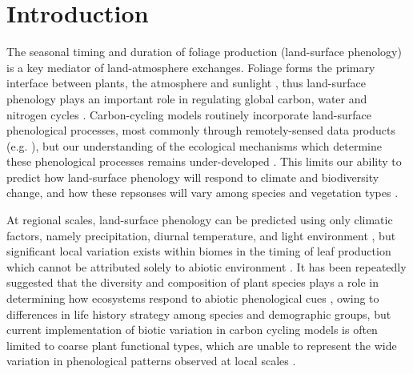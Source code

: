 \documentclass[11pt,a4paper]{article}
\begin{document}
\section{Introduction}

The seasonal timing and duration of foliage production (land-surface phenology) is a key mediator of land-atmosphere exchanges. Foliage forms the primary interface between plants, the atmosphere and sunlight \citep{Gu2003, Penuelas2009}, thus land-surface phenology plays an important role in regulating global carbon, water and nitrogen cycles \citep{Richardson2013}. Carbon-cycling models routinely incorporate land-surface phenological processes, most commonly through remotely-sensed data products (e.g. \citealt{Bloom2016}), but our understanding of the ecological mechanisms which determine these phenological processes remains under-developed \citep{Whitley2017}. This limits our ability to predict how land-surface phenology will respond to climate and biodiversity change, and how these repsonses will vary among species and vegetation types \citep{Xia2015}.

At regional scales, land-surface phenology can be predicted using only climatic factors, namely precipitation, diurnal temperature, and light environment \citep{Adole2018a}, but significant local variation exists within biomes in the timing of leaf production which cannot be attributed solely to abiotic environment \citep{Stockli2011}. It has been repeatedly suggested that the diversity and composition of plant species plays a role in determining how ecosystems respond to abiotic phenological cues \citep{Adole2018b, Jeganathan2014, Fuller1999}, owing to differences in life history strategy among species and demographic groups, but current implementation of biotic variation in carbon cycling models is often limited to coarse plant functional types, which are unable to represent the wide variation in phenological patterns observed at local scales \citep{Scheiter2013, Pavlick2013}.
\end{document}
